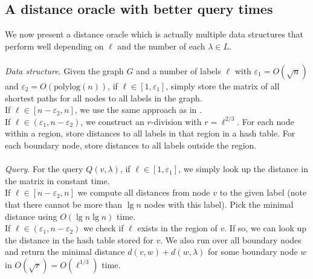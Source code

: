 \subsection{A distance oracle with better query times}
We now present a distance oracle which is actually multiple data structures that perform
well depending on $\ell$ and the number of each $\lambda\in L$. \\
\\
\textit{Data structure}. Given the graph $G$ and a number of labels $\ell$ with
$\varepsilon_1 = O(\sqrt{n})$ and $\varepsilon_2=O(\text{polylog}(n))$, if $\ell\in
[1, \varepsilon_1]$, simply store the matrix of all shortest paths for all nodes to all
labels in the graph. \\
If $\ell\in [n-\varepsilon_2, n]$, we use the same approach as in
\cite{gawrychowski2017better}. \\
If $\ell\in (\varepsilon_1, n-\varepsilon_2)$, we construct an $r$-division with $r=\ell^{2/3}$. For each node within a region, store distances to all
labels in that region in a hash table. For each boundary node, store distances to all
labels outside the region. \\
\\
\textit{Query}. For the query $Q(v, \lambda)$, if $\ell\in[1, \varepsilon_1]$, we simply look up the distance in the matrix
in constant time. \\
If $\ell\in [n-\varepsilon_2, n]$ we compute all distances from node $v$ to the given label (note
that there cannot be more than $\lg n$ nodes with this label). Pick the minimal distance
using $O(\lg n\lg n)$ time. \\
If $\ell\in (\varepsilon_1, n-\varepsilon_2)$ we check if $\ell$ exists in the region of $v$. If so,
we can look up the distance in the hash table
stored for $v$. We also run over all boundary nodes and return the minimal distance
$d(v,w)+d(w,\lambda)$ for some boundary node $w$ in
$O(\sqrt{r})=O(\ell^{1/3})$ time. \\


